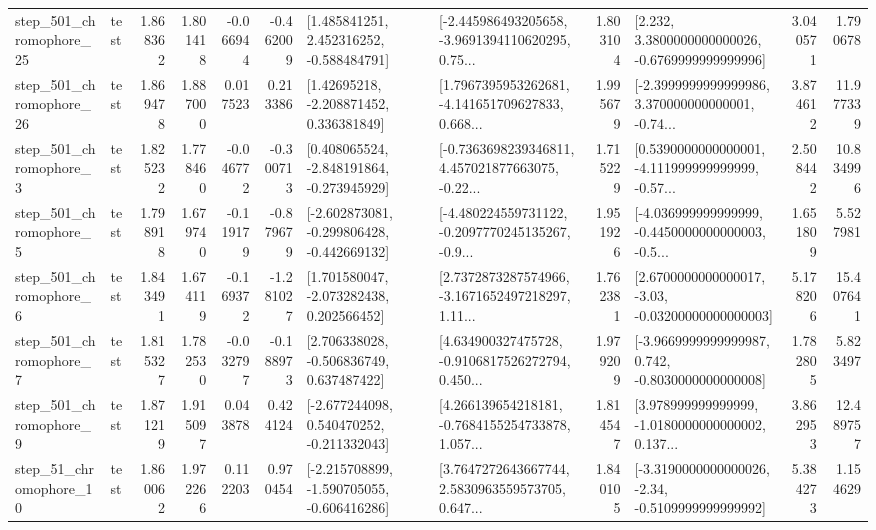 \begin{tabular}{llrrrrllrlrr}
  step\_501\_chromophore\_25 &      test &      1.868362 &    1.801418 &     -0.066944 & -0.462009 &    [1.485841251, 2.452316252, -0.588484791] &  [-2.445986493205658, -3.9691394110620295, 0.75... &       1.803104 &   [2.232, 3.3800000000000026, -0.6769999999999996] &            3.040571 &          1.790678 \\
  step\_501\_chromophore\_26 &      test &      1.869478 &    1.887000 &      0.017523 &  0.213386 &     [1.42695218, -2.208871452, 0.336381849] &  [1.7967395953262681, -4.141651709627833, 0.668... &       1.995679 &  [-2.3999999999999986, 3.370000000000001, -0.74... &            3.874612 &         11.977339 \\
   step\_501\_chromophore\_3 &      test &      1.825232 &    1.778460 &     -0.046772 & -0.300713 &   [0.408065524, -2.848191864, -0.273945929] &  [-0.7363698239346811, 4.457021877663075, -0.22... &       1.715229 &  [0.5390000000000001, -4.111999999999999, -0.57... &            2.508442 &         10.834996 \\
   step\_501\_chromophore\_5 &      test &      1.798918 &    1.679740 &     -0.119179 & -0.879679 &  [-2.602873081, -0.299806428, -0.442669132] &  [-4.480224559731122, -0.2097770245135267, -0.9... &       1.951926 &  [-4.036999999999999, -0.4450000000000003, -0.5... &            1.651809 &          5.527981 \\
   step\_501\_chromophore\_6 &      test &      1.843491 &    1.674119 &     -0.169372 & -1.281027 &    [1.701580047, -2.073282438, 0.202566452] &  [2.7372873287574966, -3.1671652497218297, 1.11... &       1.762381 &  [2.6700000000000017, -3.03, -0.03200000000000003] &            5.178206 &         15.407641 \\
   step\_501\_chromophore\_7 &      test &      1.815327 &    1.782530 &     -0.032797 & -0.188973 &    [2.706338028, -0.506836749, 0.637487422] &  [4.634900327475728, -0.9106817526272794, 0.450... &       1.979209 &  [-3.9669999999999987, 0.742, -0.8030000000000008] &            1.782805 &          5.823497 \\
   step\_501\_chromophore\_9 &      test &      1.871219 &    1.915097 &      0.043878 &  0.424124 &   [-2.677244098, 0.540470252, -0.211332043] &  [4.266139654218181, -0.7684155254733878, 1.057... &       1.814547 &  [3.978999999999999, -1.0180000000000002, 0.137... &            3.862953 &         12.489757 \\
   step\_51\_chromophore\_10 &      test &      1.860062 &    1.972266 &      0.112203 &  0.970454 &  [-2.215708899, -1.590705055, -0.606416286] &  [3.7647272643667744, 2.5830963559573705, 0.647... &       1.840105 &  [-3.3190000000000026, -2.34, -0.5109999999999992] &            5.384273 &          1.154629 \\

\end{tabular}
